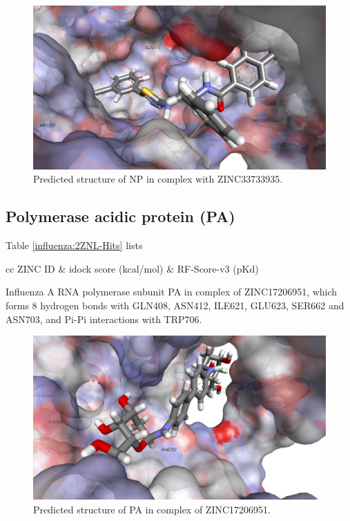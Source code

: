 \begin{figure}
\centering
\includegraphics[width=\linewidth]{../influenza/2IQH-ZINC33733935.png}
\caption{Predicted structure of NP in complex with ZINC33733935.}
\label{influenza:2IQH-ZINC33733935}
\end{figure}

\subsection{Polymerase acidic protein (PA)}

Table \ref{influenza:2ZNL-Hits} lists

\begin{table}
\caption{Top ligands .}
\label{influenza:2ZNL-Hits}
\begin{tabular}{cc}
\hline
ZINC ID & idock score (kcal/mol) & RF-Score-v3 (pKd)\\
\hline
\hline
\end{tabular}
\end{table}

Influenza A RNA polymerase subunit PA in complex of ZINC17206951, which forms 8 hydrogen bonds with GLN408, ASN412, ILE621, GLU623, SER662 and ASN703, and Pi-Pi interactions with TRP706.

\begin{figure}
\centering
\includegraphics[width=\linewidth]{../influenza/2ZNL-ZINC17206951.png}
\caption{Predicted structure of PA in complex of ZINC17206951.}
\label{influenza:2ZNL-ZINC17206951}
\end{figure}

